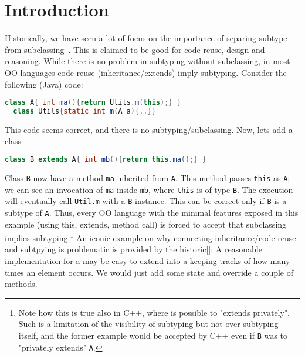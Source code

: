 \section{Introduction}

Historically, we have seen a lot of focus on the importance of
separing subtype from subclassing~\cite{cook}.  This is claimed to be
good for code reuse, design and reasoning.  While there is no problem
in subtyping without subclassing, in most OO languages code reuse
(inheritance/extends) imply subtyping.  Consider the following (Java)
code:

\begin{lstlisting}[language=Java]
  class A{ int ma(){return Utils.m(this);} }
  class Utils{static int m(A a){..}}
\end{lstlisting}

This code seems correct, and there is no subtyping/subclassing.
Now, lets add a class \Q@B@

\begin{lstlisting}[language=Java]
  class B extends A{ int mb(){return this.ma();} }
\end{lstlisting}

Class \lstinline{B} now have a method \lstinline{ma} inherited from \lstinline{A}.
This method passes \lstinline{this} as \lstinline{A}; we can see an invocation of \lstinline{ma}
inside \lstinline{mb}, where \lstinline{this} is of type \lstinline{B}.
The execution will eventually call \lstinline{Util.m} with a \lstinline{B} instance.
This can be correct only if \lstinline{B} is a subtype of \lstinline{A}.
Thus, every OO language with the minimal features 
exposed in this example (using this, extends, method call)
is forced to accept that subclassing implies subtyping.\footnote{
Note how this is true also in C++, where is possible to
"extends privately". Such is a limitation of the visibility of
subtyping but not over subtyping itself, and the former example
would be accepted by C++ even if \lstinline{B} was to "privately extends" \lstinline{A}.}
An iconic example on why connecting inheritance/code reuse and subtpying is problematic is
provided by the historic[]:
A reasonable implementation for a \Q@Set@ may be easy to extend into a \Q@Bag@ keeping tracks of how many times an element occurs.
We would just add some state and override a couple of methods.

